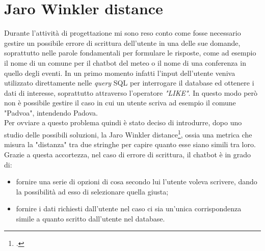 \section{Jaro Winkler distance}
Durante l'attività di progettazione mi sono reso conto come fosse necessario gestire un possibile errore di scrittura dell'utente in una delle sue domande, soprattutto nelle parole fondamentali per formulare le risposte, come ad esempio il nome di un comune per il \gls{chatbot} del meteo o il nome di una conferenza in quello degli eventi. In un primo momento infatti l'input dell'utente veniva utilizzato direttamente nelle \emph{query} \gls{SQL} per interrogare il database ed ottenere i dati di interesse, soprattutto attraverso l'operatore \emph{"LIKE"}. In questo modo però non è possibile gestire il caso in cui un utente scriva ad esempio il comune "Padvoa", intendendo Padova. \\
Per ovviare a questo problema quindi è stato deciso di introdurre, dopo uno studio delle possibili soluzioni, la Jaro Winkler distance\footcite{jaro}, ossia una metrica che misura la "distanza" tra due stringhe per capire quanto esse siano simili tra loro. Grazie a questa accortezza, nel caso di errore di scrittura, il \gls{chatbot} è in grado di:
\begin{itemize}
	\item fornire una serie di opzioni di cosa secondo lui l'utente voleva scrivere, dando la possibilità ad esso di selezionare quella giusta;
	\item fornire i dati richiesti dall'utente nel caso ci sia un'unica corrispondenza simile a quanto scritto dall'utente nel database.
\end{itemize}